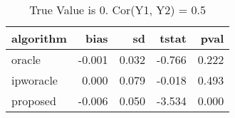 \begin{table}[h!]
\caption{True Value is 0. Cor(Y1, Y2) = 0.5}
\centering
\begin{tabular}[t]{lrrrr}
\toprule
algorithm & bias & sd & tstat & pval\\
\midrule
oracle & -0.001 & 0.032 & -0.766 & 0.222\\
ipworacle & 0.000 & 0.079 & -0.018 & 0.493\\
proposed & -0.006 & 0.050 & -3.534 & 0.000\\
\bottomrule
\end{tabular}
\end{table}

